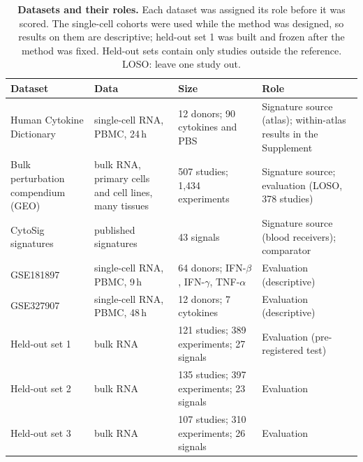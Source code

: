\begin{table}[!ht]
\centering
\caption{\textbf{Datasets and their roles.} Each dataset was assigned its role before it was scored.
The single-cell cohorts were used while the method was designed, so results on them are descriptive; held-out
set 1 was built and frozen after the method was fixed. Held-out sets contain only studies outside the reference.
LOSO: leave one study out.}
\label{tab:datasets}
\small
\begin{tabular}{p{2.8cm}p{2.6cm}p{2.6cm}p{3.3cm}}
\toprule
Dataset & Data & Size & Role \\
\midrule
Human Cytokine Dictionary~\cite{oesinghaus2025cytokinedictionary} & single-cell RNA, PBMC, 24\,h & 12 donors; 90 cytokines and PBS & Signature source (atlas); within-atlas results in the Supplement \\
Bulk perturbation compendium (GEO) & bulk RNA, primary cells and cell lines, many tissues & 507 studies; 1,434 experiments & Signature source; evaluation (LOSO, 378 studies) \\
CytoSig signatures~\cite{jiang2021cytosig} & published signatures & 43 signals & Signature source (blood receivers); comparator \\
\midrule
GSE181897~\cite{hartoularos2023gse181897} & single-cell RNA, PBMC, 9\,h & 64 donors; IFN-$\beta$, IFN-$\gamma$, TNF-$\alpha$ & Evaluation (descriptive) \\
GSE327907~\cite{wood2026gse327907} & single-cell RNA, PBMC, 48\,h & 12 donors; 7 cytokines & Evaluation (descriptive) \\
Held-out set 1 & bulk RNA & 121 studies; 389 experiments; 27 signals & Evaluation (pre-registered test) \\
Held-out set 2 & bulk RNA & 135 studies; 397 experiments; 23 signals & Evaluation \\
Held-out set 3 & bulk RNA & 107 studies; 310 experiments; 26 signals & Evaluation \\
\bottomrule
\end{tabular}
\end{table}
